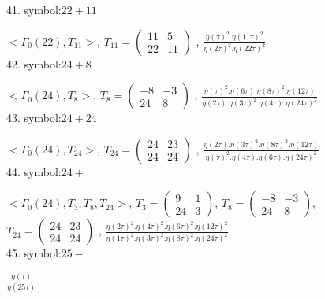 41. symbol:$ 22+11 $

$ < \Gamma_0 ( 22 ), T_{11} >  $,
$
T_{11} = 
\left(
\begin{array}{cc}
11 & 5 \\
22 & 11
\end{array}
\right)
$
, {$ \frac{\eta(\tau)^2 . \eta(11\tau)^2}{\eta(2\tau)^2 . \eta(22\tau)^2} $}
\\

42. symbol:$ 24+8 $

$ < \Gamma_0 ( 24 ), T_8 >  $,
$
T_8 = 
\left(
\begin{array}{cc}
-8 & -3 \\
24 & 8
\end{array}
\right)
$
, {$ \frac{\eta(\tau)^2 . \eta(6\tau) .\eta(8\tau)^2 .\eta(12\tau)}{\eta(2\tau) . \eta(3\tau)^2 .\eta(4\tau) .\eta(24\tau)^2} $}
\\

43. symbol:$ 24+24 $

$ < \Gamma_0 ( 24 ), T_{24} >  $,
$
T_{24} = 
\left(
\begin{array}{cc}
24 & 23 \\
24 & 24
\end{array}
\right)
$
, {$ \frac{\eta(2\tau) . \eta(3\tau)^2 .\eta(8\tau)^2 .\eta(12\tau)}{\eta(\tau)^2 . \eta(4\tau) .\eta(6\tau) .\eta(24\tau)^2} $}
\\

44. symbol:$ 24+ $

$ < \Gamma_0 ( 24 ), T_3, T_8, T_{24} >  $,
$
T_3 = 
\left(
\begin{array}{cc}
9 & 1 \\
24 & 3
\end{array}
\right)
$,
$
T_8 = 
\left(
\begin{array}{cc}
-8 & -3 \\
24 & 8
\end{array}
\right)
$,
$
T_{24} = 
\left(
\begin{array}{cc}
24 & 23 \\
24 & 24
\end{array}
\right)
$
, {$ \frac{\eta(2\tau)^2 . \eta(4\tau)^2 .\eta(6\tau)^2 .\eta(12\tau)^2}{\eta(1\tau)^2 . \eta(3\tau)^2 .\eta(8\tau)^2 .\eta(24\tau)^2} $}
\\

45. symbol:$ 25- $

 {$ \frac{\eta(\tau)}{\eta(25\tau)} $}
\\